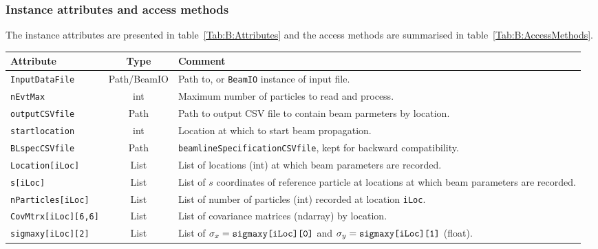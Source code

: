 \subsubsection{Instance attributes and access methods}
\label{Para:BLE:InstAttr}
The instance attributes are presented in table~\ref{Tab:B:Attributes}
and the access methods are summarised in table~\ref{Tab:B:AccessMethods}.
\begin{sidewaystable}[h]
  \caption{
    Definition of attributes of instances of the \texttt{Beam} class.
  }
  \label{Tab:B:Attributes}
  \begin{center}
    \begin{tabular}{|l|c|p{12cm}|}
      \hline
      \textbf{Attribute} & \textbf{Type} & \textbf{Comment}                                                          \\
      \hline
      \texttt{InputDataFile}      & Path/BeamIO & Path to, or \texttt{BeamIO} instance of input file.                \\
      \texttt{nEvtMax}            & int         & Maximum number of particles to read and process.                   \\
      \texttt{outputCSVfile}      & Path        & Path to output CSV file to contain beam parmeters by location.     \\
      \texttt{startlocation}      & int         & Location at which to start beam propagation.                       \\
      \texttt{BLspecCSVfile}      & Path        & \texttt{beamlineSpecificationCSVfile}, kept for backward compatibility. \\
      \texttt{Location[iLoc]}     & List        & List of locations (int) at which beam parameters are recorded.     \\
      \texttt{s[iLoc]}            & List        & List of $s$ coordinates of reference particle at locations at which
                                                  beam parameters are recorded.                                      \\
      \texttt{nParticles[iLoc]}   & List        & List of number of particles (int) recorded at location \texttt{iLoc}. \\
      \texttt{CovMtrx[iLoc][6,6]} & List        & List of covariance matrices (ndarray) by location.                 \\
      \texttt{sigmaxy[iLoc][2]}   & List        & List of $\sigma_x={\rm \texttt{sigmaxy[iLoc][0]}}$ and
                                                  $\sigma_y={\rm \texttt{sigmaxy[iLoc][1]}}$ (float).                  \\

\end{tabular}
\end{center}
\end{sidewaystable}
